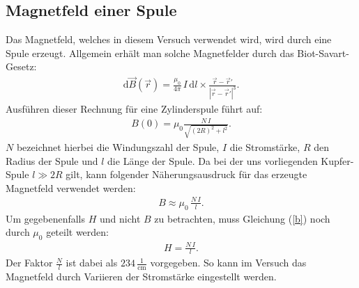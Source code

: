 \documentclass[german,  %
parskip=full,  %
]{scrartcl}
\begin{document}
\subsection{Magnetfeld einer Spule}
Das Magnetfeld, welches in diesem Versuch verwendet wird, wird durch eine Spule erzeugt. Allgemein erhält man solche Magnetfelder durch das Biot-Savart-Gesetz:
\begin{align}
\text{d}\vec{B}(\vec{r}) = \frac{\mu_{0}}{4\pi} \, I \, \text{d}l \times \frac{\vec{r}- \vec{r}'}{|\vec{r}- \vec{r}'|^3}.
\end{align}
Ausführen dieser Rechnung für eine Zylinderspule führt auf:
\begin{align}
B(0) = \mu_{0} \frac{N\,I}{\sqrt{(2R)^2+l^2}}.
\end{align}
$N$ bezeichnet hierbei die Windungszahl der Spule, $I$ die Stromstärke, $R$ den Radius der Spule und $l$ die Länge der Spule. Da bei der uns vorliegenden Kupfer-Spule $l \gg 2R$ gilt, kann folgender Näherungsausdruck für das erzeugte Magnetfeld verwendet werden:
\begin{align}
\label{b}
B \approx \mu_{0} \, \frac{N \, I}{l}.
\end{align}
Um gegebenenfalls $H$ und nicht $B$ zu betrachten, muss Gleichung (\ref{b}) noch durch $\mu_0$ geteilt werden:
\begin{align}
H = \frac{N \, I}{l}.
\end{align}
Der Faktor $\frac{N}{l}$ ist dabei als $234  \, \frac{1}{\text{cm}}$ vorgegeben. So kann im Versuch das Magnetfeld durch Variieren der Stromstärke eingestellt werden.
\end{document}

